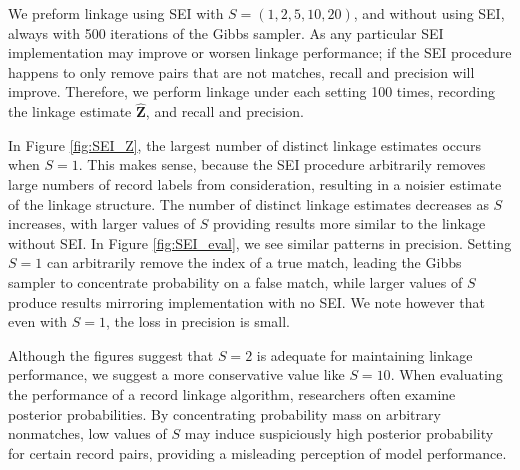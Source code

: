 \documentclass[ba]{imsart}
\begin{document}
We preform linkage using SEI with $S = (1, 2, 5, 10, 20)$, and without using SEI, always with 500 iterations of the Gibbs sampler. As any particular SEI implementation may improve or worsen linkage performance; if the SEI procedure happens to only remove pairs that are not matches, recall and precision will improve. Therefore, we perform linkage under each setting 100 times, recording the linkage estimate $\hat{\bm{Z}}$, and recall and precision.

In Figure \ref{fig:SEI_Z}, the largest number of distinct linkage estimates occurs when $S = 1$. This makes sense, because the SEI procedure arbitrarily removes large numbers of record labels from consideration, resulting in a noisier estimate of the linkage structure. The number of distinct linkage estimates decreases as $S$ increases, with larger values of $S$ providing results more similar to the linkage without SEI. In Figure \ref{fig:SEI_eval}, we see similar patterns in precision. Setting $S=1$ can arbitrarily remove the index of a true match, leading the Gibbs sampler to concentrate probability on a false match, while larger values of $S$ produce results mirroring implementation with no SEI. We note however that even with $S=1$, the loss in precision is small.

Although the figures suggest that $S=2$ is adequate for maintaining linkage performance, we suggest a more conservative value like $S=10$. When evaluating the performance of a record linkage algorithm, researchers often examine posterior probabilities. By concentrating probability mass on arbitrary nonmatches, low values of $S$ may induce suspiciously high posterior probability for certain record pairs, providing a misleading perception of model performance. 
\end{document}
